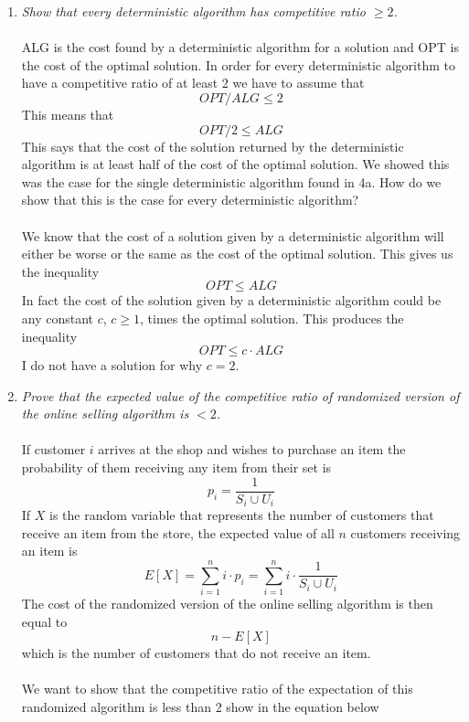 \documentclass[12pt]{article}
\begin{document}
\begin{enumerate}
\begin{enumerate}
      \item \textit{Show that every deterministic algorithm has competitive
      ratio $\ge 2$.}\\
      \\
      ALG is the cost found by a deterministic algorithm for a solution and
      OPT is the cost of the optimal solution.  In order for every deterministic
      algorithm to have a competitive ratio of at least 2 we have to assume that
      $$
      OPT/ALG \le 2
      $$
      This means that
      $$
      OPT/2 \le ALG
      $$
      This says that the cost of the solution returned by the deterministic
      algorithm is at least half of the cost of the optimal solution.  We showed
      this was the case for the single deterministic algorithm found in 4a.  How
      do we show that this is the case for every deterministic algorithm?\\
      \\
      We know that the cost of a solution given by a deterministic algorithm
      will either be worse or the same as the cost of the optimal solution. 
      This gives us the inequality
      $$
      OPT \le ALG
      $$
      In fact the cost of the solution given by a deterministic algorithm could
      be any constant $c$, $c \ge 1$, times the optimal
      solution.
      This produces the inequality
      $$
      OPT \le c \cdot ALG
      $$
      I do not have a solution for why $c=2$.
      \item \textit{Prove that the expected value of the competitive ratio of
      randomized version of the online selling algorithm is $< 2$.}\\
      \\
      If customer $i$ arrives at the shop and wishes to purchase an item the
      probability of them receiving any item from their set is 
      $$
      p_i = \frac{1}{S_i \cup U_i}
      $$
      If $X$ is the random variable that represents the number of customers
      that receive an item from the store, the expected value of all $n$
      customers receiving an item is 
      $$ 
      E[X] = \sum_{i=1}^{n} i \cdot p_i = \sum_{i=1}^{n} i \cdot \frac{1}{S_i
      \cup U_i} $$
      The cost of the randomized version of the online selling algorithm is then
      equal to
      $$
      n - E[X]
      $$
      which is the number of customers that do not receive an item.\\
      \\
      We want to show that the competitive ratio of the expectation of this
      randomized algorithm is less than 2 show in the equation below 

\end{enumerate}
\end{enumerate}
\end{document}
